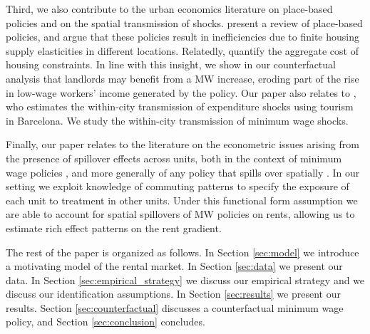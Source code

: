 Third, we also contribute to the urban economics literature on place-based 
policies and on the spatial transmission of shocks.
\textcite{KlineMoretti2014} present a review of place-based policies, and 
argue that these policies result in inefficiencies due to finite housing supply 
elasticities in different locations.
Relatedly, \textcite{HsiehMoretti2019} quantify the aggregate cost of housing 
constraints.
In line with this insight, we show in our counterfactual analysis that landlords
may benefit from a MW increase, eroding part of the rise in low-wage workers' 
income generated by the policy.
Our paper also relates to \textcite{AllenEtAl2020}, who estimates the 
within-city transmission of expenditure shocks using tourism in Barcelona.
We study the within-city transmission of minimum wage shocks.

Finally, our paper relates to the literature on the econometric issues arising 
from the presence of spillover effects across units,
both in the context of minimum wage policies \parencite{Kuehn2016, Huang2020}, 
and more generally of any policy that spills over spatially
\parencite{DelgadoFlorax2015, Butts2021}.
In our setting we exploit knowledge of commuting patterns to specify the 
exposure of each unit to treatment in other units.
Under this functional form assumption we are able to account for spatial 
spillovers of MW policies on rents, allowing us to estimate rich effect patterns 
on the rent gradient.

The rest of the paper is organized as follows.
In Section \ref{sec:model} we introduce a motivating model of the rental market.
In Section \ref{sec:data} we present our data.
In Section \ref{sec:empirical_strategy} we discuss our empirical strategy and
we discuss our identification assumptions.
In Section \ref{sec:results} we present our results.
Section \ref{sec:counterfactual} discusses a counterfactual minimum wage policy, and
Section \ref{sec:conclusion} concludes.
